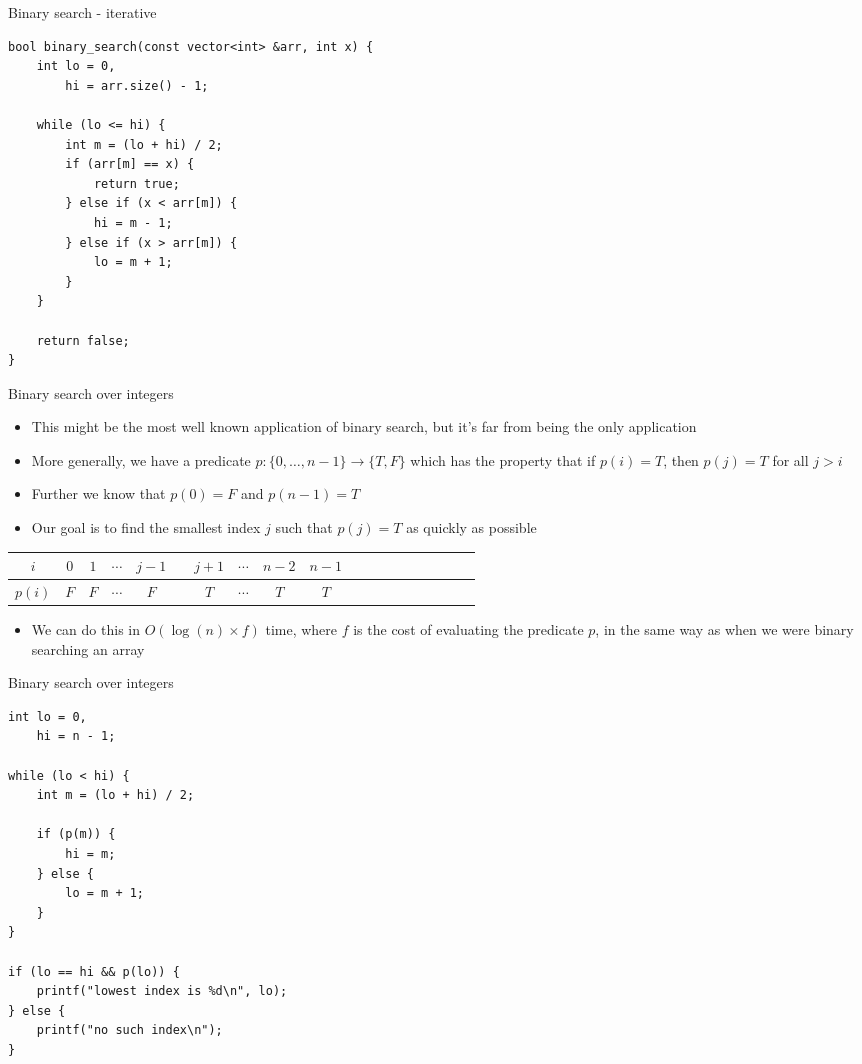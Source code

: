 \documentclass[12pt,t]{beamer}
\newcommand{\bi}{\begin{itemize}}
\newcommand{\ei}{\end{itemize}}
\begin{document}
\begin{frame}[fragile]{Binary search - iterative}
    \vspace{20pt}
    \begin{verbatim}
bool binary_search(const vector<int> &arr, int x) {
    int lo = 0,
        hi = arr.size() - 1;

    while (lo <= hi) {
        int m = (lo + hi) / 2;
        if (arr[m] == x) {
            return true;
        } else if (x < arr[m]) {
            hi = m - 1;
        } else if (x > arr[m]) {
            lo = m + 1;
        }
    }

    return false;
}
    \end{verbatim}
\end{frame}

\begin{frame}{Binary search over integers}
    \bi
        \item This might be the most well known application of binary search, but it's far from being the only application
        \item More generally, we have a predicate $p : \{0,\ldots,n-1\} \rightarrow \{T, F\}$ which has the property that if $p(i) = T$, then $p(j) = T$ for all $j > i$
		\item Further we know that $p(0) = F$ and $p(n-1) = T$
        \item Our goal is to find the smallest index $j$ such that $p(j) = T$ as quickly as possible
    \ei

    \begin{center}
        \begin{tabular}{ccccccccccccccccccc}
            $i$ & $0$ & $1$ & $\cdots$ & $j-1$ & \color{vhilight}{$j$} & $j+1$ & $\cdots$ & $n-2$ & $n-1$ \\
            \hline
            $p(i)$ & $F$ & $F$ & $\cdots$ & $F$ & \color{vhilight}{$T$} & $T$ & $\cdots$ & $T$ & $T$ \\
        \end{tabular}
    \end{center}

    \bi
        \item We can do this in $O(\log(n) \times f)$ time, where $f$ is the cost of evaluating the predicate $p$, in the same way as when we were binary searching an array
    \ei
\end{frame}

\begin{frame}[fragile]{Binary search over integers}
    \begin{verbatim}
int lo = 0,
    hi = n - 1;

while (lo < hi) {
    int m = (lo + hi) / 2;

    if (p(m)) {
        hi = m;
    } else {
        lo = m + 1;
    }
}

if (lo == hi && p(lo)) {
    printf("lowest index is %d\n", lo);
} else {
    printf("no such index\n");
}
    \end{verbatim}
\end{frame}
\end{document}
